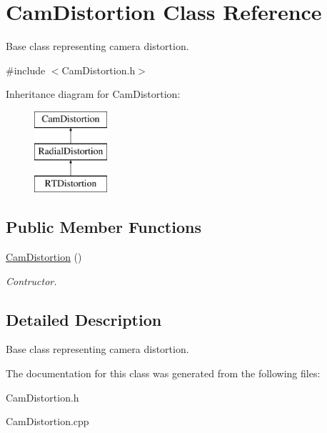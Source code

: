 \hypertarget{classCamDistortion}{
\section{CamDistortion Class Reference}
\label{classCamDistortion}
}


Base class representing camera distortion.  




{\ttfamily \#include $<$CamDistortion.h$>$}

Inheritance diagram for CamDistortion:\begin{figure}[H]
\begin{center}
\leavevmode
\includegraphics[height=3.000000cm]{classCamDistortion}
\end{center}
\end{figure}
\subsection*{Public Member Functions}
\begin{DoxyCompactItemize}
\item 
\hypertarget{classCamDistortion_afa8b5ea3910f856522246529911b0362}{
\hyperlink{classCamDistortion_afa8b5ea3910f856522246529911b0362}{CamDistortion} ()}
\label{classCamDistortion_afa8b5ea3910f856522246529911b0362}

\begin{DoxyCompactList}\small\item\em Contructor. \end{DoxyCompactList}\end{DoxyCompactItemize}


\subsection{Detailed Description}
Base class representing camera distortion. 

The documentation for this class was generated from the following files:\begin{DoxyCompactItemize}
\item 
CamDistortion.h\item 
CamDistortion.cpp\end{DoxyCompactItemize}
